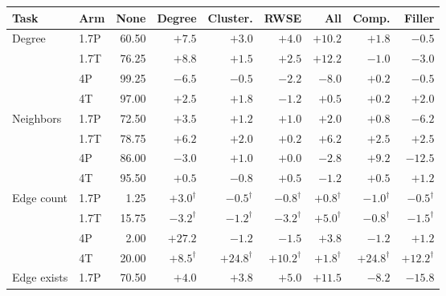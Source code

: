 \begin{table}[t]
\centering\scriptsize
\setlength{\tabcolsep}{3.4pt}
\begin{tabular}{llrrrrrrr}
\toprule
Task & Arm & None & Degree & Cluster. & RWSE & All & Comp. & Filler\\
\midrule
Degree & 1.7P & 60.50 & \cellcolor{black!12}$\mathbf{+7.5}$ & $+3.0$ & $+4.0$ & \cellcolor{black!12}$\mathbf{+10.2}$ & $+1.8$ & $-0.5$\\ %
 & 1.7T & 76.25 & \cellcolor{black!12}$\mathbf{+8.8}$ & $+1.5$ & $+2.5$ & \cellcolor{black!12}$\mathbf{+12.2}$ & $-1.0$ & $-3.0$\\ %
 & 4P & 99.25 & \cellcolor{black!12}$\mathbf{-6.5}$ & $-0.5$ & $\mathbf{-2.2}$ & \cellcolor{black!12}$\mathbf{-8.0}$ & $+0.2$ & $-0.5$\\ %
 & 4T & 97.00 & \cellcolor{black!12}$+2.5$ & $+1.8$ & $-1.2$ & \cellcolor{black!12}$+0.5$ & $+0.2$ & $+2.0$\\ %
\addlinespace[2pt]
Neighbors & 1.7P & 72.50 & $+3.5$ & $+1.2$ & $+1.0$ & $+2.0$ & $+0.8$ & $\mathbf{-6.2}$\\ %
 & 1.7T & 78.75 & $\mathbf{+6.2}$ & $+2.0$ & $+0.2$ & $\mathbf{+6.2}$ & $+2.5$ & $+2.5$\\ %
 & 4P & 86.00 & $-3.0$ & $+1.0$ & $+0.0$ & $-2.8$ & $\mathbf{+9.2}$ & $\mathbf{-12.5}$\\ %
 & 4T & 95.50 & $+0.5$ & $-0.8$ & $+0.5$ & $-1.2$ & $+0.5$ & $+1.2$\\ %
\addlinespace[2pt]
Edge count & 1.7P & 1.25 & \cellcolor{black!12}$+3.0^{\dagger}$ & $-0.5^{\dagger}$ & $-0.8^{\dagger}$ & \cellcolor{black!12}$+0.8^{\dagger}$ & $-1.0^{\dagger}$ & $-0.5^{\dagger}$\\ %
 & 1.7T & 15.75 & \cellcolor{black!12}$-3.2^{\dagger}$ & $-1.2^{\dagger}$ & $-3.2^{\dagger}$ & \cellcolor{black!12}$+5.0^{\dagger}$ & $-0.8^{\dagger}$ & $-1.5^{\dagger}$\\ %
 & 4P & 2.00 & \cellcolor{black!12}$\mathbf{+27.2}$ & $-1.2$ & $-1.5$ & \cellcolor{black!12}$\mathbf{+3.8}$ & $-1.2$ & $+1.2$\\ %
 & 4T & 20.00 & \cellcolor{black!12}$\mathbf{+8.5}^{\dagger}$ & $\mathbf{+24.8}^{\dagger}$ & $\mathbf{+10.2}^{\dagger}$ & \cellcolor{black!12}$+1.8^{\dagger}$ & $\mathbf{+24.8}^{\dagger}$ & $\mathbf{+12.2}^{\dagger}$\\ %
\addlinespace[2pt]
Edge exists & 1.7P & 70.50 & $+4.0$ & $+3.8$ & $+5.0$ & $\mathbf{+11.5}$ & $\mathbf{-8.2}$ & $\mathbf{-15.8}$\\ %

\end{tabular}
\end{table}
